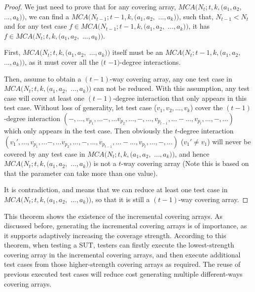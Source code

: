 \documentclass[conference]{IEEEtran}
\theoremstyle{definition}
\begin{document}
\begin{proof}
We just need to prove that for any covering array, $MCA(N_{t}; t, k, (a_{1},a_{2},$ $...,a_{k}))$, we can find a $MCA(N_{t-1}; t-1, k, (a_{1},a_{2},$ $...,a_{k}))$, such that, $N_{t-1} < N_{t}$ and for any test case  $f \in MCA(N_{t-1}; t-1, k, (a_{1},a_{2},$ $...,a_{k}))$, it has $f \in MCA(N_{t}; t, k, (a_{1},a_{2},$ $...,a_{k}))$.

 First, $MCA(N_{t}; t, k, (a_{1},a_{2},$ $...,a_{k}))$ itself must be an $MCA(N_{t}; t - 1, k, (a_{1},a_{2},$ $...,a_{k}))$, as it must cover all the $(t$ $ -1)$-degree interactions. 
 
 Then, assume to obtain a $(t-1)$-way covering array, any one test case in $MCA(N_{t}; t, k, (a_{1},a_{2},$ $...,a_{k}))$ can not be reduced. With this assumption, any test case will cover at least one $(t-1)$-degree interaction that only appears in this test case. Without loss of generality,  let test case  ($v_{1}, v_{2}, ..., v_{k}$) cover the $(t-1)$-degree interaction $(-, ..., v_{p_{1}},...-,... v_{p_{2}},...,-, ..., v_{p_{t-1}},...-...,v_{p_{t}},...,-, ...)$ which only appears in the test case. Then obviously the $t$-degree interaction $(v_{1}', ..., v_{p_{1}},...-,... v_{p_{2}},...,-, ..., v_{p_{t-1}},...-...,v_{p_{t}},...,-, ...)$  ($v_{1}' \neq v_{1}$) will never be covered by any test case in $MCA(N_{t}; t, k, (a_{1},a_{2},$ $...,a_{k}))$, and hence $MCA(N_{t}; t, k, (a_{1},a_{2},$ $...,a_{k}))$ is not a $t$-way covering array (Note this is based on that the parameter can take more than one value).

 It is contradiction, and means that we can reduce at least one test case in $MCA(N_{t}; t, k, (a_{1},a_{2},$ $...,a_{k}))$, so that it is still a $(t-1)$-way covering array.
\end{proof}

This theorem shows the existence of the incremental covering arrays. As discussed before, generating the incremental covering arrays is of importance, as it supports adaptively increasing the coverage strength. According to this theorem, when testing a SUT, testers can firstly execute the lowest-strength covering array in the incremental covering arrays, and then execute additional test cases from those higher-strength covering arrays as required. The reuse of previous executed test cases will reduce cost generating multiple different-ways covering arrays.
\end{document}
